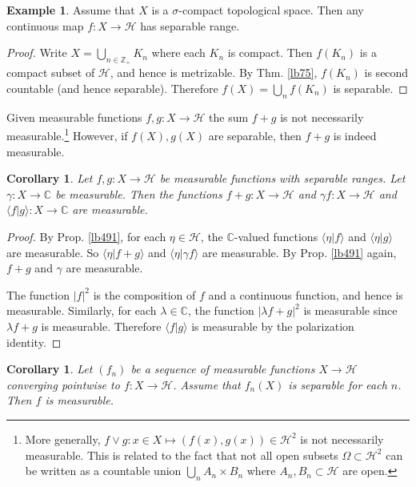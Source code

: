 \documentclass[12pt,b5paper,notitlepage]{article}
\theoremstyle{definition}
\newtheorem{eg}[df]{Example}
\theoremstyle{plain}
\newtheorem{co}[df]{Corollary}
\newcommand{\bk}[1]{\langle {#1}\rangle}
\newcommand{\Cbb}{\mathbb C}
\newcommand{\Zbb}{\mathbb Z}
\newcommand{\MH}{\mathcal H}
\numberwithin{equation}{section}
\begin{document}
\begin{subappendices}
\begin{eg}\label{lb515}
Assume that $X$ is a $\sigma$-compact topological space. Then any continuous map $f:X\rightarrow \MH$ has separable range.
\end{eg}

\begin{proof}
Write $X=\bigcup_{n\in\Zbb_+} K_n$ where each $K_n$ is compact. Then $f(K_n)$ is a compact subset of $\MH$, and hence is metrizable. By Thm. \ref{lb75}, $f(K_n)$ is second countable (and hence separable). Therefore $f(X)=\bigcup_n f(K_n)$ is separable.
\end{proof}



Given measurable functions $f,g:X\rightarrow \MH$ the sum $f+g$ is not necessarily measurable.\footnote{More generally, $f\vee g:x\in X\mapsto (f(x),g(x))\in \MH^2$ is not necessarily measurable. This is related to the fact that not all open subsets $\Omega\subset \MH^2$ can be written as a countable union $\bigcup_n A_n\times B_n$ where $A_n,B_n\subset \MH$ are open.} However, if $f(X),g(X)$ are separable, then $f+g$ is indeed measurable.

\begin{co}\label{lb520}
Let $f,g:X\rightarrow \MH$ be measurable functions with separable ranges. Let $\gamma:X\rightarrow\Cbb$ be measurable. Then the functions $f+g:X\rightarrow\MH$ and $\gamma f:X\rightarrow\MH$ and $\bk{f|g}:X\rightarrow\Cbb$ are measurable.
\end{co}


\begin{proof}
By Prop. \ref{lb491}, for each $\eta\in \MH$, the $\Cbb$-valued functions $\bk{\eta|f}$ and $\bk{\eta|g}$ are measurable. So $\bk{\eta|f+g}$ and $\bk{\eta|\gamma f}$ are measurable. By Prop. \ref{lb491} again, $f+g$ and $\gamma$ are measurable.

The function $|f|^2$ is the composition of $f$ and a continuous function, and hence is measurable. Similarly, for each $\lambda\in\Cbb$, the function $|\lambda f+g|^2$ is measurable since $\lambda f+g$ is measurable. Therefore $\bk{f|g}$ is measurable by the polarization identity. 
\end{proof}


\begin{co}\label{lb519}
Let $(f_n)$ be a sequence of measurable functions $X\rightarrow \MH$ converging pointwise to $f:X\rightarrow \MH$. Assume that $f_n(X)$ is separable for each $n$. Then $f$ is measurable.
\end{co}


\end{subappendices}
\end{document}
